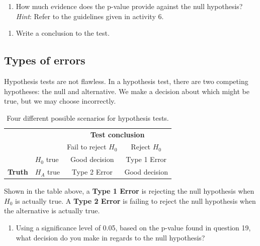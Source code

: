 \documentclass[
]{report}
\providecommand{\tightlist}{%
  \setlength{\itemsep}{0pt}\setlength{\parskip}{0pt}}
\begin{document}
\vspace{1in}

\begin{enumerate}
\def\labelenumi{\arabic{enumi}.}
\setcounter{enumi}{20}
\tightlist
\item
  How much evidence does the p-value provide against the null hypothesis? \emph{Hint}: Refer to the guidelines given in activity 6.
\end{enumerate}

\vspace{0.4in}

\begin{enumerate}
\def\labelenumi{\arabic{enumi}.}
\setcounter{enumi}{21}
\tightlist
\item
  Write a conclusion to the test.
\end{enumerate}

\vspace{1in}

\hypertarget{types-of-errors}{%
\subsection*{Types of errors}\label{types-of-errors}}

Hypothesis tests are not flawless. In a hypothesis test, there are two competing hypotheses: the null and alternative. We make a decision about which might be true, but we may choose incorrectly.

\begin{table}
\caption{Four different possible scenarios for hypothesis tests.}
\centering
\begin{tabular}[h]{ll|cc}
\hline
 & &  \multicolumn{2}{c}{\textbf{Test conclusion}} \\
 &  & \multicolumn{1}{c}{Fail to reject $H_0$} & \multicolumn{1}{c}{Reject $H_0$}\\
\hline
 & $H_0$ true & Good decision & Type 1 Error\\
\hline
\textbf{Truth} & $H_A$ true & Type 2 Error & Good decision\\
\hline
\end{tabular}
\end{table}

Shown in the table above, a \textbf{Type 1 Error} is rejecting the null hypothesis when \(H_0\) is actually true. A \textbf{Type 2 Error} is failing to reject the null hypothesis when the alternative is actually true.

\begin{enumerate}
\def\labelenumi{\arabic{enumi}.}
\setcounter{enumi}{22}
\tightlist
\item
  Using a significance level of 0.05, based on the p-value found in question 19, what decision do you make in regards to the null hypothesis?
\end{enumerate}
\end{document}
